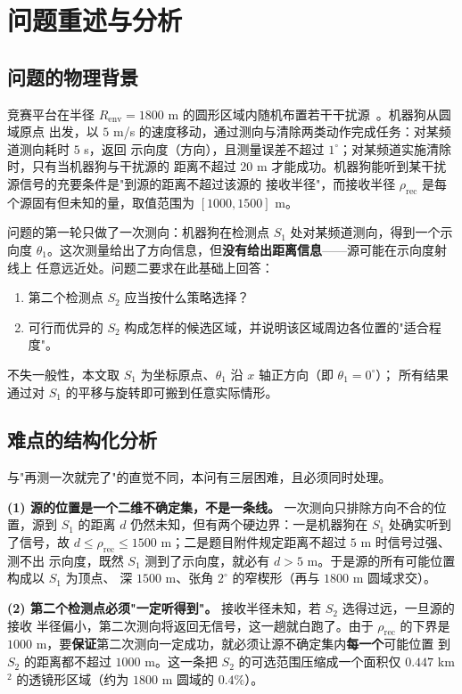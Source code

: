 \section{问题重述与分析}

\subsection{问题的物理背景}

竞赛平台在半径 $R_{\mathrm{env}}=1800$ m 的圆形区域内随机布置若干干扰源~\cite{cumcm2026b}。机器狗从圆域原点
出发，以 $5$ m/s 的速度移动，通过测向与清除两类动作完成任务：对某频道测向耗时 $5$ s，返回
示向度（方向），且测量误差不超过 $1^\circ$；对某频道实施清除时，只有当机器狗与干扰源的
距离不超过 $20$ m 才能成功。机器狗能听到某干扰源信号的充要条件是"到源的距离不超过该源的
接收半径"，而接收半径 $\rho_{\mathrm{rec}}$ 是每个源固有但未知的量，取值范围为
$[1000,1500]$ m。

问题的第一轮只做了一次测向：机器狗在检测点 $S_1$ 处对某频道测向，得到一个示向度
$\theta_1$。这次测量给出了方向信息，但\textbf{没有给出距离信息}——源可能在示向度射线上
任意远近处。问题二要求在此基础上回答：

\begin{enumerate}
  \item 第二个检测点 $S_2$ 应当按什么策略选择？
  \item 可行而优异的 $S_2$ 构成怎样的候选区域，并说明该区域周边各位置的"适合程度"。
\end{enumerate}

不失一般性，本文取 $S_1$ 为坐标原点、$\theta_1$ 沿 $x$ 轴正方向（即 $\theta_1=0^\circ$）；
所有结果通过对 $S_1$ 的平移与旋转即可搬到任意实际情形。

\subsection{难点的结构化分析}

与"再测一次就完了"的直觉不同，本问有三层困难，且必须同时处理。

\textbf{(1) 源的位置是一个二维不确定集，不是一条线。} 一次测向只排除方向不合的位置，源到
$S_1$ 的距离 $d$ 仍然未知，但有两个硬边界：一是机器狗在 $S_1$ 处确实听到了信号，故
$d\le\rho_{\mathrm{rec}}\le1500$ m；二是题目附件规定距离不超过 $5$ m 时信号过强、测不出
示向度，既然 $S_1$ 测到了示向度，就必有 $d>5$ m。于是源的所有可能位置构成以 $S_1$ 为顶点、
深 $1500$ m、张角 $2^\circ$ 的窄楔形（再与 $1800$ m 圆域求交）。

\textbf{(2) 第二个检测点必须"一定听得到"。} 接收半径未知，若 $S_2$ 选得过远，一旦源的接收
半径偏小，第二次测向将返回无信号，这一趟就白跑了。由于 $\rho_{\mathrm{rec}}$ 的下界是
$1000$ m，要\textbf{保证}第二次测向一定成功，就必须让源不确定集内\textbf{每一个}可能位置
到 $S_2$ 的距离都不超过 $1000$ m。这一条把 $S_2$ 的可选范围压缩成一个面积仅
$0.447$ km$^2$ 的透镜形区域（约为 $1800$ m 圆域的 $0.4\%$）。

